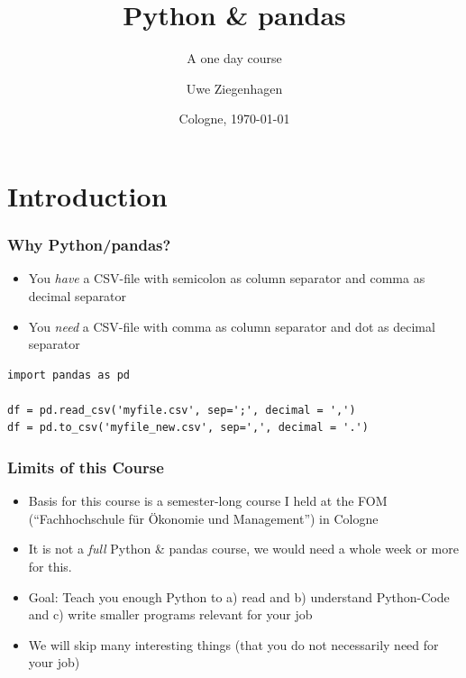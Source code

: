 \documentclass[ngerman]{beamer}
\author{Uwe Ziegenhagen}
\title{Python \& pandas}
\subtitle{A one day course}
\institute{\url{github.com/UweZiegenhagen/OneDayPythonPandasCourse}}
\date{Cologne, \today}
\begin{document}
\begin{frame}

\maketitle

\end{frame}

\section{Introduction}

\begin{frame}[fragile]
\frametitle{Why Python/pandas?}

\begin{itemize}
	\item You \textit{have} a CSV-file with semicolon as column separator and comma as decimal separator
	\item You \textit{need} a CSV-file with comma as column separator and dot as decimal separator
\end{itemize}

\begin{lstlisting}
import pandas as pd

df = pd.read_csv('myfile.csv', sep=';', decimal = ',')
df = pd.to_csv('myfile_new.csv', sep=',', decimal = '.')
\end{lstlisting}


\end{frame}

\begin{frame}
\frametitle{Limits of this Course}

\begin{itemize}
\item Basis for this course is a semester-long course I held at the FOM (\enquote{Fachhochschule für Ökonomie und Management}) in Cologne 
\item It is not a \textit{full} Python \& pandas course, we would need a whole week or more for this.
\item Goal: Teach you enough Python to a) read and b) understand Python-Code and c) write smaller programs relevant for your job 
\item We will skip many interesting things (that you do not necessarily need for your job)
\end{itemize}
\end{frame}
\end{document}
